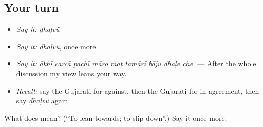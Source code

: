 \subsection*{Your turn}
\begin{itemize}
\raggedright
  \item \emph{Say it:} \emph{ḍhaḷvũ}
  \item \emph{Say it:} \emph{ḍhaḷvũ}, once more
  \item \emph{Say it:} \emph{ākhī carcā pachī māro mat tamārī bāju ḍhaḷe che.} — After the whole discussion my view leans your way.
  \item \emph{Recall:} say the Gujarati for against, then the Gujarati for in agreement, then say \emph{ḍhaḷvũ} again
\end{itemize}

\begin{tcolorbox}[breakable,colback=teal!4,colframe=teal!35!black,title={Before you move on}]
What does  mean? (\textquotedblleft{}To lean towards; to slip down\textquotedblright{}.) Say it once more.
\end{tcolorbox}
